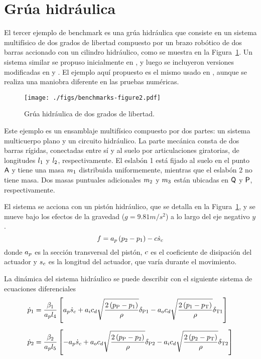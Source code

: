 \section{Grúa hidráulica}
\label{sec:grua}

El tercer ejemplo de benchmark es una grúa hidráulica que consiste en un sistema multifísico de dos grados de libertad compuesto por un brazo robótico de dos barras accionado con un cilindro hidráulico, como se muestra en la Figura~\ref{fig:GruaMono}.
Un sistema similar se propuso inicialmente en \cite{Naya2011}, y luego se incluyeron versiones modificadas en \cite{Peiret2018} y \cite{Rahikainen2020}.
El ejemplo aquí propuesto es el mismo usado en \cite{Peiret2018}, aunque se realiza una maniobra diferente en las pruebas numéricas.

\begin{figure}[ht!]\centering
	\texttt{[image: ./figs/benchmarks-figure2.pdf]}
	\caption{Grúa hidráulica de dos grados de libertad.}
	\label{fig:GruaMono}
\end{figure}

Este ejemplo es un ensamblaje multifísico compuesto por dos partes: un sistema multicuerpo plano y un circuito hidráulico.
La parte mecánica consta de dos barras rígidas, conectadas entre sí y al suelo por articulaciones giratorias, de longitudes $l_1$ y $l_2$, respectivamente.
El eslabón 1 está fijado al suelo en el punto $\mathsf{ A }$ y tiene una masa $m_1$ distribuida uniformemente, mientras que el eslabón 2 no tiene masa.
Dos masas puntuales adicionales $m_2$ y $m_3$ están ubicadas en $\mathsf{ Q }$ y $\mathsf{ P }$, respectivamente.

El sistema se acciona con un pistón hidráulico, que se detalla en la Figura~\ref{fig:GruaMono}, y se mueve bajo los efectos de la gravedad ($g=9.81\unit{m/s^2}$) a lo largo del eje negativo $y$ .
%
\begin{equation}
	f = a_p \left( p_2 - p_1 \right) - c \dot{s}_c
	\label{eq:cylinderForce}
\end{equation}
%
donde $a_p$ es la sección transversal del pistón, $c$ es el coeficiente de disipación del actuador y $s_c$ es la longitud del actuador, que varía durante el movimiento.

La dinámica del sistema hidráulico se puede describir con el siguiente sistema de ecuaciones diferenciales
%
\begin{align}
	\label{eq:hydODE1}
	\dot{p}_1 
	&=
	\dfrac{\beta_1}{a_p l_4}
	\left[ a_p \dot{s}_c 
		+ a_i c_d \sqrt{\dfrac{2 \left( p_{\text{P}} - p_1 \right)}{\rho}}\delta_{\text{P1}} 
		- a_o c_d \sqrt{\dfrac{2 \left( p_1 - p_{\text{T}} \right)}{\rho}}\delta_{\text{T1}} \right]
	\\[2mm]
	\dot{p}_2 
	&=
	\dfrac{\beta_2}{a_p l_5}
	\left[ - a_p \dot{s}_c 
		+ a_o c_d \sqrt{\dfrac{2 \left( p_{\text{P}} - p_2 \right)}{\rho}}\delta_{\text{P2}} 
		- a_i c_d \sqrt{\dfrac{2 \left( p_2 - p_{\text{T}} \right)}{\rho}}\delta_{\text{T2}} \right]
	\label{eq:hydODE2}
\end{align}

